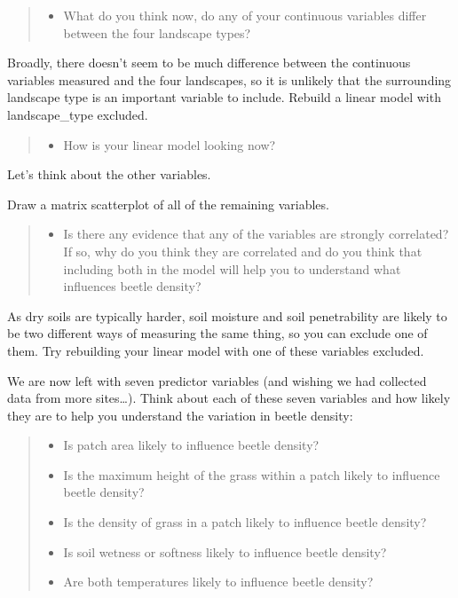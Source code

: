 \documentclass[
]{book}
\providecommand{\tightlist}{%
  \setlength{\itemsep}{0pt}\setlength{\parskip}{0pt}}
\begin{document}
\begin{quote}
\begin{itemize}
\tightlist
\item
  What do you think now, do any of your continuous variables differ between the four landscape types?
\end{itemize}
\end{quote}

Broadly, there doesn't seem to be much difference between the continuous variables measured and the four landscapes, so it is unlikely that the surrounding landscape type is an important variable to include. Rebuild a linear model with landscape\_type excluded.

\begin{quote}
\begin{itemize}
\tightlist
\item
  How is your linear model looking now?
\end{itemize}
\end{quote}

Let's think about the other variables.

Draw a matrix scatterplot of all of the remaining variables.

\begin{quote}
\begin{itemize}
\tightlist
\item
  Is there any evidence that any of the variables are strongly correlated? If so, why do you think they are correlated and do you think that including both in the model will help you to understand what influences beetle density?
\end{itemize}
\end{quote}

As dry soils are typically harder, soil moisture and soil penetrability are likely to be two different ways of measuring the same thing, so you can exclude one of them. Try rebuilding your linear model with one of these variables excluded.

We are now left with seven predictor variables (and wishing we had collected data from more sites\ldots). Think about each of these seven variables and how likely they are to help you understand the variation in beetle density:

\begin{quote}
\begin{itemize}
\tightlist
\item
  Is patch area likely to influence beetle density?
\item
  Is the maximum height of the grass within a patch likely to influence beetle density?
\item
  Is the density of grass in a patch likely to influence beetle density?
\item
  Is soil wetness or softness likely to influence beetle density?
\item
  Are both temperatures likely to influence beetle density?
\end{itemize}
\end{quote}
\end{document}
